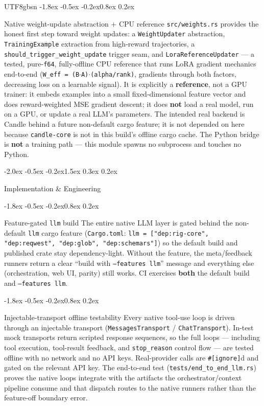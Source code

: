 \documentclass{article}
\makeatletter
\renewcommand{\section}{\@startsection{section}{1}{\z@}%
  {-2.0ex \@plus -0.5ex \@minus -0.2ex}{1.5ex \@plus 0.3ex \@minus 0.2ex}%
  {\large\bfseries\raggedright\color{accent}}}
\renewcommand{\subsection}{\@startsection{subsection}{2}{\z@}%
  {-1.8ex \@plus -0.5ex \@minus -0.2ex}{0.8ex \@plus 0.2ex}%
  {\normalsize\bfseries\raggedright\color{accent}}}
\makeatother
\begin{document}
\begin{CJK}{UTF8}{gbsn}
\subsection{Native weight-update abstraction + CPU reference}
\texttt{src/weights.rs} provides the honest first step toward weight updates: a
\texttt{WeightUpdater} abstraction, \texttt{TrainingExample} extraction from
high-reward trajectories, a \texttt{should\_trigger\_weight\_update} trigger seam,
and \texttt{LoraReferenceUpdater} --- a tested, pure-\texttt{f64}, fully-offline CPU
reference that runs LoRA gradient mechanics end-to-end
(\texttt{W\_eff = (B$\cdot$A)$\cdot$(alpha/rank)}, gradients through both factors,
decreasing loss on a learnable signal). It is explicitly a \textbf{reference}, not a
GPU trainer: it embeds examples into a small fixed-dimensional feature vector and
does reward-weighted MSE gradient descent; it does \textbf{not} load a real model,
run on a GPU, or update a real LLM's parameters. The intended real backend is Candle
behind a future non-default cargo feature; it is not depended on here because
\texttt{candle-core} is not in this build's offline cargo cache. The Python bridge is
\textbf{not} a training path --- this module spawns no subprocess and touches no
Python.

\section{Implementation \& Engineering}

\subsection{Feature-gated \texttt{llm} build}
The entire native LLM layer is gated behind the non-default \texttt{llm} cargo
feature (\texttt{Cargo.toml}:
\texttt{llm = ["dep:rig-core", "dep:reqwest", "dep:glob", "dep:schemars"]}) so the
default build and published crate stay dependency-light. Without the feature, the
meta/feedback runners return a clear ``build with \texttt{--features llm}'' message
and everything else (orchestration, web UI, parity) still works. CI exercises
\textbf{both} the default build and \texttt{--features llm}.

\subsection{Injectable-transport offline testability}
\label{sec:offline}
Every native tool-use loop is driven through an injectable transport
(\texttt{MessagesTransport} / \texttt{ChatTransport}). In-test mock transports return
scripted response sequences, so the full loops --- including tool execution,
tool-result feedback, and \texttt{stop\_reason} control flow --- are tested offline
with no network and no API keys. Real-provider calls are \texttt{\#[ignore]}d and
gated on the relevant API key. The end-to-end test
(\texttt{tests/end\_to\_end\_llm.rs}) proves the native loops integrate with the
artifacts the orchestrator/context pipeline consume and that dispatch routes to the
native runners rather than the feature-off boundary error.


\end{CJK}
\end{document}
